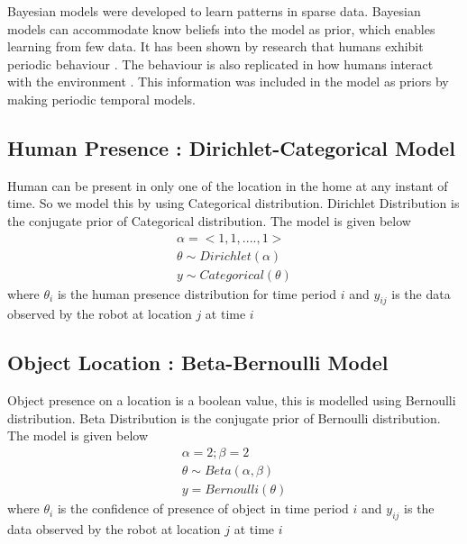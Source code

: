 \documentclass[a4paper, 10pt, conference]{ieeeconf}      %
\begin{document}
Bayesian models were developed to learn patterns in sparse data. Bayesian models can accommodate know beliefs into the model as prior, which enables learning from few data. It has been shown by research that humans exhibit periodic behaviour \cite{c7}. The behaviour is also replicated in how humans interact with the environment \cite{c8}. 
This information was included in the model as priors by making periodic temporal models.

\subsection{Human Presence : Dirichlet-Categorical Model}
Human can be present in only one of the location in the home at any instant of time. So we model this by using Categorical distribution. Dirichlet Distribution is the conjugate prior of Categorical distribution. The model is given below
\begin{gather*}
	\alpha = <1, 1, .... , 1 > \\
	\theta \sim Dirichlet(\alpha) \\
	y \sim Categorical(\theta)
\end{gather*}
where $\theta_i$ is the human presence distribution for time period $i$ and $y_{ij}$ is the data observed by the robot at location $j$ at time $i$ 
\subsection{Object Location : Beta-Bernoulli Model}
Object presence on a location is a boolean value, this is modelled using Bernoulli distribution. Beta Distribution is the conjugate prior of Bernoulli distribution. The model is given below
\begin{gather*}
	\alpha = 2 ; \beta = 2 \\
	\theta \sim Beta(\alpha, \beta) \\
	y = Bernoulli(\theta)
\end{gather*}
where $\theta_i$ is the confidence of presence of object in time period $i$ and $y_{ij}$ is the data observed by the robot at location $j$ at time $i$ 
\end{document}
